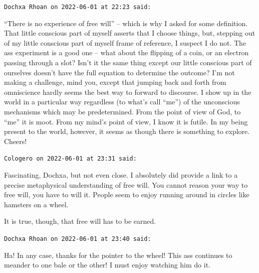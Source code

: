 \begin{footnotesize}
\begin{sffamily}
\hfill

\texttt{Dochxa Rhoan on 2022-06-01 at 22:23 said:}

``There is no experience of free will'' -- which is why I asked for some definition. That little conscious part of myself asserts that I choose things, but, stepping out of my little conscious part of myself frame of reference, I suspect I do not. The ass experiment is a good one -- what about the flipping of a coin, or an electron passing through a slot? Isn't it the same thing except our little conscious part of ourselves doesn't have the full equation to determine the outcome? I'm not making a challenge, mind you, except that jumping back and forth from omniscience hardly seems the best way to forward to discourse. I show up in the world in a particular way regardless (to what's call ``me'') of the unconscious mechanisms which may be predetermined. From the point of view of God, to ``me'' it is moot. From my mind's point of view, I know it is futile. In my being present to the world, however, it seems as though there is something to explore. Cheers!

\hfill

\texttt{Cologero on 2022-06-01 at 23:31 said:}

Fascinating, Dochxa, but not even close. I absolutely did provide a link to a precise metaphysical understanding of free will. You cannot reason your way to free will, you have to will it. People seem to enjoy running around in circles like hamsters on a wheel.

It is true, though, that free will has to be earned.

\hfill

\texttt{Dochxa Rhoan on 2022-06-01 at 23:40 said:}

Ha! In any case, thanks for the pointer to the wheel! This ass continues to meander to one bale or the other! I must enjoy watching him do it.

\end{sffamily}
\end{footnotesize}

